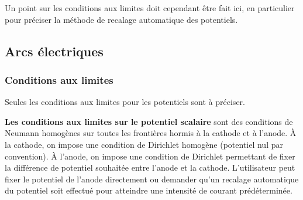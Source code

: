 Un point sur les conditions aux limites doit cependant \^etre fait ici, en
particulier pour pr\'eciser la m\'ethode de recalage automatique des
potentiels.



\subsection*{Arcs \'electriques}

\subsubsection*{Conditions aux limites}

Seules les conditions aux limites pour les potentiels sont \`a pr\'eciser.

{\bf Les conditions aux limites sur le potentiel scalaire} sont des conditions de
Neumann homog\`enes sur toutes les fronti\`eres hormis \`a la cathode et \`a
l'anode. \`A la cathode, on impose une condition de Dirichlet homog\`ene (potentiel nul par convention). \`A l'anode, on impose une
condition de Dirichlet permettant de fixer la diff\'erence de potentiel
souhait\'ee entre l'anode et la cathode.
L'utilisateur peut fixer le potentiel de l'anode directement ou
demander qu'un recalage automatique du potentiel soit effectu\'e pour atteindre
une intensit\'e de courant pr\'ed\'etermin\'ee.

